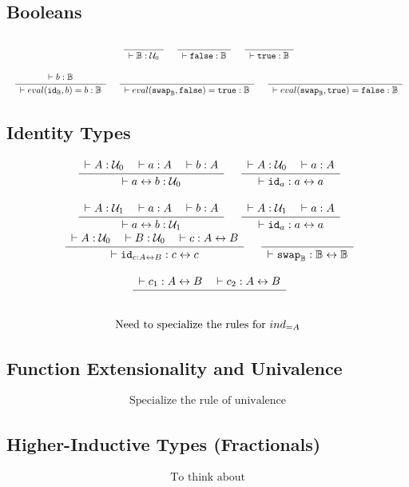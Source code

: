\documentclass[format=acmlarge,review,natbib]{acmart}
\newcommand{\evalone}[2]{eval(#1,#2)}
\newcommand{\idc}{\mathtt{id}}
\newcommand{\swapc}{\mathtt{swap}}
\newcommand{\iso}{\leftrightarrow}
\newcommand{\fc}{\mathtt{false}}
\newcommand{\tc}{\mathtt{true}}
\newcommand{\boolt}{\mathbb{B}}
\newcommand{\uzero}{\mathcal{U}_0}
\newcommand{\uone}{\mathcal{U}_1}
\newcommand{\Rule}[2]{
\makebox{
$\displaystyle
\frac{\begin{array}{l}#1\\\end{array}}
{\begin{array}{l}#2\\\end{array}}$}}
\newcommand{\proves}{\vdash}
\newcommand{\jdg}[3]{#1 \proves #2 : #3}
\begin{document}
\subsection{Booleans}

\[\begin{array}{c}
\Rule{}{\jdg{}{\boolt}{\uzero}}
\quad
\Rule{}{\jdg{}{\fc}{\boolt}}
\quad
\Rule{}{\jdg{}{\tc}{\boolt}}
\\
\\
\Rule{\jdg{}{b}{\boolt}}
        {\jdg{}{\evalone{\idc_{\boolt}}{b} = b}{\boolt}}
\quad
\Rule{}
        {\jdg{}{\evalone{\swapc_{\boolt}}{\fc} = \tc}{\boolt}}
\quad
\Rule{}
        {\jdg{}{\evalone{\swapc_{\boolt}}{\tc} = \fc}{\boolt}}
\end{array}\]

\subsection{Identity Types}

\[\begin{array}{c}
\Rule{\jdg{}{A}{\uzero}
         \quad\jdg{}{a}{A}
         \quad\jdg{}{b}{A}}
        {\jdg{}{a \iso b}{\uzero}}
\quad
\Rule{\jdg{}{A}{\uzero}
          \quad\jdg{}{a}{A}}
         {\jdg{}{\idc_{a}}{a \iso a}}
\\
\\
\Rule{\jdg{}{A}{\uone}
         \quad\jdg{}{a}{A}
         \quad\jdg{}{b}{A}}
        {\jdg{}{a \iso b}{\uone}}
\quad
\Rule{\jdg{}{A}{\uone}
          \quad\jdg{}{a}{A}}
         {\jdg{}{\idc_{a}}{a \iso a}}
\\
\Rule{\jdg{}{A}{\uzero}
         \quad\jdg{}{B}{\uzero}
         \quad\jdg{}{c}{A \iso B}}
         {\jdg{}{\idc_{c:A\iso B}}{c \iso c}}
\quad
\Rule{}{\jdg{}{\swapc_{\boolt}}{\boolt\iso\boolt}}
\\
\\
\Rule{\jdg{}{c_1}{A \iso B}
         \quad\jdg{}{c_2}{A \iso B}}
         {}
\\
\\
\mbox{Need to specialize the rules for } ind_{=A}
\end{array}\]

\subsection{Function Extensionality and Univalence}

\[\begin{array}{c}
\mbox{Specialize the rule of univalence}
\end{array}\]

\subsection{Higher-Inductive Types (Fractionals)}

\[\begin{array}{c}
\mbox{To think about}
\end{array}\]


{\footnotesize

}
\end{document}
